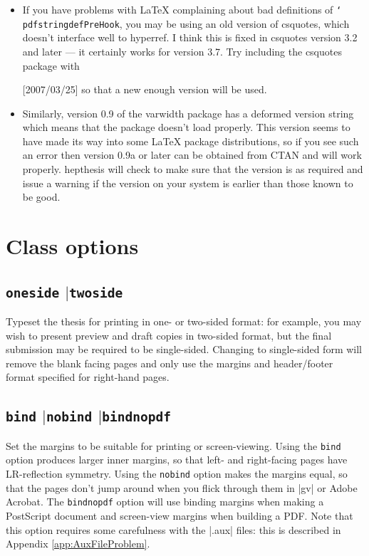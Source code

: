 \documentclass[12pt]{scrartcl}
\newcommand{\Or}{\texorpdfstring{\ensuremath{\vert}\xspace}{or}}
\newcommand{\texcmd}[1]{\texorpdfstring{\texttt{\char`\\#1}}{#1}}
\newcommand{\texopt}[1]{\texorpdfstring{\texttt{#1}}{#1}}
\newcommand{\texpkg}[1]{#1}
\newenvironment{snippet}{\Verbatim}{\endVerbatim}
\begin{document}
\begin{itemize}
\item
If you have problems with \LaTeX{} complaining about bad definitions of
\texcmd{pdfstringdefPreHook}, you may be using an old version of \texpkg{csquotes},
which doesn't interface well to \texpkg{hyperref}. I think this is fixed in
\texpkg{csquotes} version 3.2 and later --- it certainly works for version
3.7. Try including the \texpkg{csquotes} package with
%
\begin{snippet}
\usepackage{csquotes}[2007/03/25]
\end{snippet}
%
so that a new enough version will be used.

\item
Similarly, version 0.9 of the \texpkg{varwidth} package has a deformed version
string which means that the package doesn't load properly. This version seems to
have made its way into some \LaTeX{} package distributions, so if you see such
an error then version 0.9a or later can be obtained from CTAN and will work
properly. \texpkg{hepthesis} will check to make sure that the version is as
required and issue a warning if the version on your system is earlier than those
known to be good.

\end{itemize}


\section{Class options}
\label{sec:Options}

\subsection{\texopt{oneside} \Or \texopt{twoside}}
Typeset the thesis for printing in one- or two-sided format: for example, you
may wish to present preview and draft copies in two-sided format, but the final
submission may be required to be single-sided. Changing to single-sided form
will remove the blank facing pages and only use the margins and header/footer
format specified for right-hand pages.

\subsection{\texopt{bind} \Or \texopt{nobind} \Or \texopt{bindnopdf}}
Set the margins to be suitable for printing or screen-viewing. Using the
\texopt{bind} option produces larger inner margins, so that left- and
right-facing pages have LR-reflection symmetry. Using the \texopt{nobind}
option makes the margins equal, so that the pages don't jump around when you
flick through them in |gv| or Adobe Acrobat. The \texopt{bindnopdf} option
will use binding margins when making a PostScript document and screen-view
margins when building a PDF. Note that this option requires some carefulness
with the |.aux| files: this is described in Appendix \ref{app:AuxFileProblem}.
\end{document}
